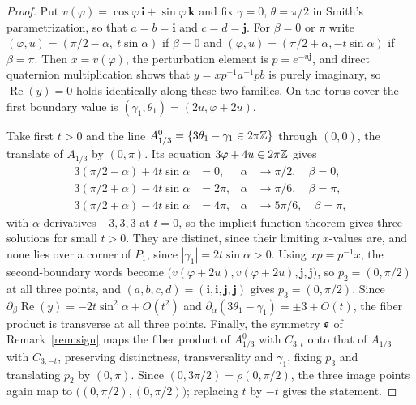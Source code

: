 \begin{proof}
Put $v(\varphi)=\cos\varphi\,\mathbf i+\sin\varphi\,\mathbf k$ and fix $\gamma=0$, $\theta=\pi/2$ in
Smith's parametrization, so that $a=b=\mathbf i$ and $c=d=\mathbf j$.  For $\beta=0$ or $\pi$ write
$(\varphi,u)=(\pi/2-\alpha,\ t\sin\alpha)$ if $\beta=0$ and $(\varphi,u)=(\pi/2+\alpha,-t\sin\alpha)$ if
$\beta=\pi$.  Then $x=v(\varphi)$, the perturbation element is $p=e^{-u\mathbf j}$, and direct
quaternion multiplication shows that $y=xp^{-1}a^{-1}pb$ is purely imaginary, so
$\operatorname{Re}(y)=0$ holds identically along these two families.  On the torus cover the first
boundary value is $(\gamma_1,\theta_1)=(2u,\varphi+2u)$.

Take first $t>0$ and the line $A^0_{1/3}=\{3\theta_1-\gamma_1\in2\pi\mathbb{Z}\}$ through $(0,0)$, the
translate of $A_{1/3}$ by $(0,\pi)$.  Its equation $3\varphi+4u\in2\pi\mathbb{Z}$ gives
\begin{align*}
 3(\pi/2-\alpha)+4t\sin\alpha&=0,      &\alpha&\to\pi/2,\quad \beta=0,\\
 3(\pi/2+\alpha)-4t\sin\alpha&=2\pi,   &\alpha&\to\pi/6,\quad \beta=\pi,\\
 3(\pi/2+\alpha)-4t\sin\alpha&=4\pi,   &\alpha&\to5\pi/6,\quad \beta=\pi,
\end{align*}
with $\alpha$-derivatives $-3,3,3$ at $t=0$, so the implicit function theorem gives three solutions
for small $t>0$.  They are distinct, since their limiting $x$-values are, and none lies over a corner
of $P_1$, since $|\gamma_1|=2t\sin\alpha>0$.  Using $xp=p^{-1}x$, the second-boundary words become
$\bigl(v(\varphi+2u),v(\varphi+2u),\mathbf j,\mathbf j\bigr)$, so $p_2=(0,\pi/2)$ at all three
points, and $(a,b,c,d)=(\mathbf i,\mathbf i,\mathbf j,\mathbf j)$ gives $p_3=(0,\pi/2)$.  Since
$\partial_\beta\operatorname{Re}(y)=-2t\sin^2\alpha+O(t^2)$ and
$\partial_\alpha(3\theta_1-\gamma_1)=\pm3+O(t)$, the fiber product is transverse at all three points.
Finally, the symmetry $\mathfrak{s}$ of Remark~\ref{rem:sign} maps the fiber product of $A^0_{1/3}$ with
$C_{3,t}$ onto that of $A_{1/3}$ with $C_{3,-t}$, preserving distinctness, transversality and
$\gamma_1$, fixing $p_3$ and translating $p_2$ by $(0,\pi)$.  Since $(0,3\pi/2)=\rho(0,\pi/2)$, the
three image points again map to $\bigl((0,\pi/2),(0,\pi/2)\bigr)$; replacing $t$ by $-t$ gives the
statement.
\end{proof}

